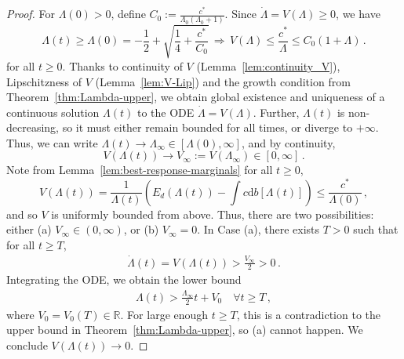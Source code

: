 \documentclass[11pt,a4paper,final]{article}
\def\R{\mathbb R}
\renewcommand{\d}{\mathrm{d}}
\newcommand{\1}{\mathbf{1}}
\theoremstyle{plain}
\numberwithin{equation}{section}
\numberwithin{theorem}{section}
\begin{document}
\begin{proof}
  For $\Lambda(0)>0$, define $C_0:= \frac{c^*}{\Lambda_0(\Lambda_0+1)}$. Since $\dot\Lambda=V(\Lambda)\ge 0$, we have 
$$
\Lambda(t)\ge \Lambda(0)= -\frac{1}{2}+\sqrt{\frac{1}{4}+\frac{c^*}{C_0}}\,\Rightarrow\,
V(\Lambda)\le \frac{c^*}{\Lambda}\le C_0(1+\Lambda)\,.
$$
for all $t\ge 0$. Thanks to continuity of $V$ (Lemma~\ref{lem:continuity_V}), Lipschitzness of $V$ (Lemma~\ref{lem:V-Lip}) and the growth condition from Theorem~\ref{thm:Lambda-upper}, we obtain global existence and uniqueness of a continuous solution $\Lambda(t)$ to the ODE $\dot\Lambda=V(\Lambda)$.
Further, $\Lambda(t)$ is non-decreasing, so it must either remain bounded for all times, or diverge to $+\infty$. Thus, we can write $\Lambda(t)\to\Lambda_\infty\in [\Lambda(0),\infty]$, and by continuity, $$V(\Lambda(t))\to V_\infty:=V(\Lambda_\infty)\in [0,\infty]\,.$$ 
Note from Lemma~\ref{lem:best-response-marginals}  for all $t\ge 0$,
$$
V(\Lambda(t))= \frac{1}{\Lambda(t)}\left(E_d(\Lambda(t))-\int c\d b[\Lambda(t)]\right)\le \frac{c^*}{\Lambda(0)}\,,
$$
and so $V$ is uniformly bounded from above. Thus, 
there are two possibilities: either (a) $V_\infty\in (0,\infty)$, or (b) $V_\infty=0$.
In Case (a), there exists $T>0$ such that for all $t\ge T$,
\begin{align*}
    \dot\Lambda(t)=V(\Lambda(t))> \frac{V_\infty}{2}>0\,.
\end{align*}
Integrating the ODE, we obtain the lower bound
\begin{align*}
    \Lambda(t)>\frac{\Lambda_\infty}{2} t + V_0 \quad \forall t\ge T\,,
\end{align*}
where $V_0=V_0(T)\in\R$. For large enough $t\ge T$, this is a contradiction to the upper bound in Theorem~\ref{thm:Lambda-upper}, so (a) cannot happen. We conclude $V(\Lambda(t))\to 0$.  
\end{proof}
\end{document}
